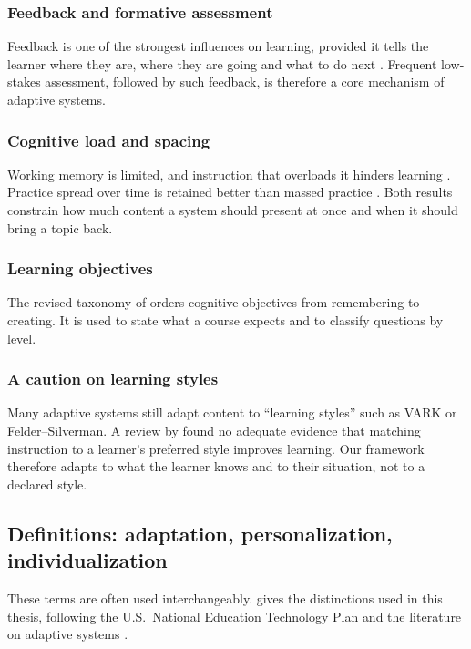\subsubsection{Feedback and formative assessment}
Feedback is one of the
strongest influences on learning, provided it tells the learner where they
are, where they are going and what to do next \cite{hattie2007}. Frequent
low-stakes assessment, followed by such feedback, is therefore a core
mechanism of adaptive systems.

\subsubsection{Cognitive load and spacing}
Working memory is limited, and
instruction that overloads it hinders learning \cite{sweller1988}.
Practice spread over time is retained better than massed practice
\cite{cepeda2006}. Both results constrain how much content a system should
present at once and when it should bring a topic back.

\subsubsection{Learning objectives}
The revised taxonomy of
\citet{anderson2001taxonomy} orders cognitive objectives from remembering
to creating. It is used to state what a course expects and to classify
questions by level.

\subsubsection{A caution on learning styles}
Many adaptive systems still
adapt content to \enquote{learning styles} such as VARK or Felder--Silverman.
A review by \citet{pashler2008} found no adequate evidence that matching
instruction to a learner's preferred style improves learning. Our
framework therefore adapts to what the learner knows and to their
situation, not to a declared style.

\subsection{Definitions: adaptation, personalization, individualization}
\label{subsec-definitions}

These terms are often used interchangeably.  gives
the distinctions used in this thesis, following the U.S.\ National
Education Technology Plan \cite{netp2010} and the literature on adaptive
systems \cite{brusilovsky2001,shute2012}.

